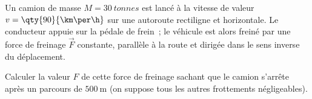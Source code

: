 Un camion de masse $M=\qty{30}{tonnes}$ est lancé à la vitesse de valeur
$v=\qty{90}{\km\per\h}$ sur une autoroute rectiligne et horizontale. Le
conducteur appuie sur la pédale de frein~; le véhicule est alors freiné par une
force de freinage $\vec{F}$ constante, parallèle à la route et dirigée dans le
sens inverse du déplacement.

Calculer la valeur $F$ de cette force de freinage sachant que le camion s'arrête
après un parcours de $\qty{500}{\m}$ (on suppose tous les autres frottements
négligeables).
